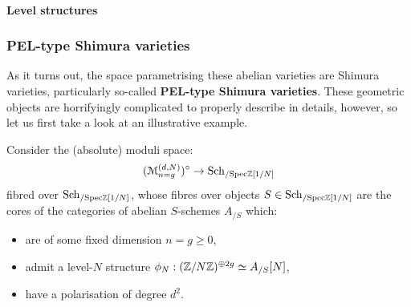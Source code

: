                 \paragraph{Level structures}
            
            \subsubsection{PEL-type Shimura varieties}
                As it turns out, the space parametrising these abelian varieties are Shimura varieties, particularly so-called \textbf{PEL-type Shimura varieties}. These geometric objects are horrifyingly complicated to properly describe in details, however, so let us first take a look at an illustrative example. 
            
                Consider the (absolute) moduli space:
                    $$(\mathcal{M}_{n = g}^{(d, N)})^{\circ} \to \mathrm{Sch}_{/\mathrm{Spec} \mathbb{Z}[1/N]}$$
                fibred over $\mathrm{Sch}_{/\mathrm{Spec} \mathbb{Z}[1/N]}$, whose fibres over objects $S \in \mathrm{Sch}_{/\mathrm{Spec} \mathbb{Z}[1/N]}$ are the cores of the categories of abelian $S$-schemes $A_{/S}$ which:
                    \begin{itemize}
                        \item are of some fixed dimension $n = g \geq 0$,
                        \item admit a level-$N$ structure $\phi_N: (\mathbb{Z}/N\mathbb{Z})^{\oplus 2g} \simeq A_{/S}[N]$,
                        \item have a polarisation of degree $d^2$.
                    \end{itemize}